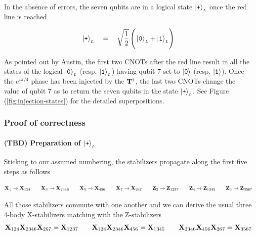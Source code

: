 \documentclass{article}
\newcommand{\Op}[1]{{\bf #1}}
\newcommand{\kett}[1]{\ket{\mbox{\tt #1}}}
\begin{document}
	In the absence of errors, the seven qubits are in a logical state $\kett{+}_{\scriptscriptstyle L}$ once the red line is reached
	
	\begin{equation*}
		\kett{+}_{\scriptscriptstyle L} \quad=\quad
			\sqrt{\frac{1}{2}}\left(\vphantom{\sqrt{\frac{1}{2}}}
				\kett{0}_{\scriptscriptstyle L} + \kett{1}_{\scriptscriptstyle L}
			\right)
		\label{eq:logical-plus-state}
	\end{equation*}

	As pointed out by Austin, the first two CNOTs after the red line result in all the states of the logical $\kett{0}_{\scriptscriptstyle L}$ (resp. $\kett{1}_{\scriptscriptstyle L}$) having qubit $7$ set to $\kett{0}$ (resp. $\kett{1}$). Once the $e^{i\pi/4}$ phase has been injected by the $\Op{T}^{\dagger}$, the last two CNOTs change the value of qubit $7$ as to return the seven qubits in the state $\kett{+}_{\scriptscriptstyle L}$. See Figure (\ref{fig:injection-states}) for the detailed superpositions.

	\subsubsection{Proof of correctness}

	\paragraph{(TBD) Preparation of $\kett{+}_{\scriptscriptstyle L}$ } Sticking to our assumed numbering, the stabilizers propagate along the first five steps as follows

	\begin{equation*}
		\Op{X}_{1} \rightarrow \Op{X}_{124}
		\qquad
		\Op{X}_{3} \rightarrow \Op{X}_{2346}
		\qquad
		\Op{X}_{5} \rightarrow \Op{X}_{456}
		\qquad
		\Op{X}_{7} \rightarrow \Op{X}_{267}
		\qquad
		\Op{Z}_{2} \rightarrow \Op{Z}_{1237}
		\qquad
		\Op{Z}_{4} \rightarrow \Op{Z}_{1345}
		\qquad
		\Op{Z}_{6} \rightarrow \Op{Z}_{3567}
	\end{equation*}

	All those stabilizers commute with one another and we can derive the usual three 4-body X-stabilizers matching with the Z-stabilizers
	\begin{equation*}
		\Op{X}_{124}\Op{X}_{2346}\Op{X}_{267} = \Op{X}_{1237}
		\qquad
		\Op{X}_{124}\Op{X}_{2346}\Op{X}_{456} = \Op{X}_{1345}
		\qquad
		\Op{X}_{2346}\Op{X}_{456}\Op{X}_{267} = \Op{X}_{3567}
	\end{equation*}
\end{document}
